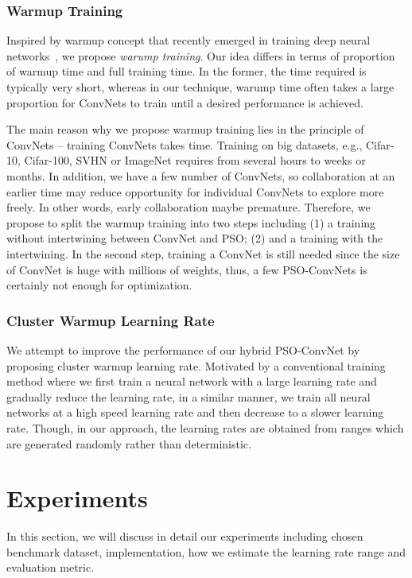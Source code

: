 \documentclass{ieeeaccess}
\begin{document}
\subsubsection{Warmup Training}
\label{sec:warmuptraining}
Inspired by warmup concept that recently emerged in training deep neural networks~\cite{vaswani2017attention,goyal2017accurate,gotmare2018closer,liu2019variance}, we propose \emph{warump training}. Our idea differs in terms of proportion of warmup time and full training time. In the former, the time required is typically very short, whereas in our technique, warump time often takes a large proportion for ConvNets to train until a desired performance is achieved.

The main reason why we propose warmup training lies in the principle of ConvNets -- training ConvNets takes time. Training on big datasets, e.g., Cifar-10, Cifar-100, SVHN or ImageNet requires from several hours to weeks or months. In addition, we have a few number of ConvNets, so collaboration at an earlier time may reduce opportunity for individual ConvNets to explore more freely. In other words, early collaboration maybe premature. Therefore, we propose to split the warmup training into two steps including (1) a training without intertwining between ConvNet and PSO; (2) and a training with the intertwining. In the second step, training a ConvNet is still needed since the size of ConvNet is huge with millions of weights, thus, a few PSO-ConvNets is certainly not enough for optimization.
\subsubsection{Cluster Warmup Learning Rate}
We attempt to improve the performance of our hybrid PSO-ConvNet by proposing cluster warmup learning rate. Motivated by a conventional training method where we first train a neural network with a large learning rate and gradually reduce the learning rate, in a similar manner, we train all neural networks at a high speed learning rate and then decrease to a slower learning rate. Though, in our approach, the learning rates are obtained from ranges which are generated randomly rather than deterministic.
\section{Experiments}
\label{sec:experiments}
In this section, we will discuss in detail our experiments including chosen benchmark dataset, implementation, how we estimate the learning rate range and evaluation metric.
\end{document}

